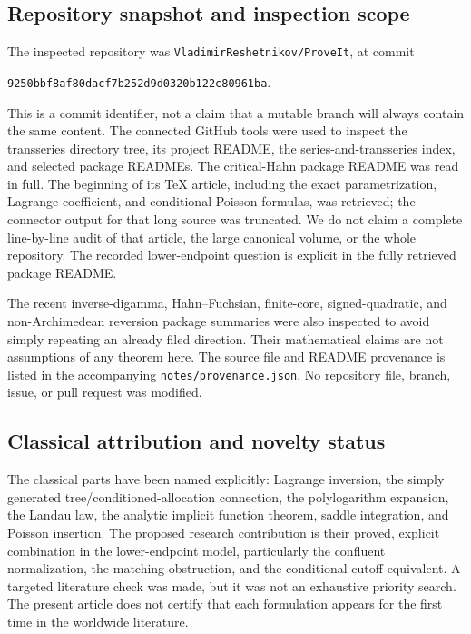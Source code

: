\documentclass[11pt,a4paper]{article}
\numberwithin{equation}{section}
\theoremstyle{definition}
\theoremstyle{remark}
\begin{document}
\subsection{Repository snapshot and inspection scope}
The inspected repository was \texttt{VladimirReshetnikov/ProveIt}, at
commit
\begin{center}\small\texttt{9250bbf8af80dacf7b252d9d0320b122c80961ba}.\end{center}
This is a commit identifier, not a claim that a mutable branch will
always contain the same content. The connected GitHub tools were used
to inspect the transseries directory tree, its project README, the
series-and-transseries index, and selected package READMEs. The
critical-Hahn package README was read in full. The beginning of its
TeX article, including the exact parametrization, Lagrange coefficient,
and conditional-Poisson formulas, was retrieved; the connector output
for that long source was truncated. We do not claim a complete
line-by-line audit of that article, the large canonical volume, or the
whole repository. The recorded lower-endpoint question is explicit in
the fully retrieved package README.

The recent inverse-digamma, Hahn--Fuchsian, finite-core, signed-quadratic,
and non-Archimedean reversion package summaries were also inspected to
avoid simply repeating an already filed direction. Their mathematical
claims are not assumptions of any theorem here. The source file and
README provenance is listed in the accompanying
\texttt{notes/provenance.json}. No repository file, branch, issue,
or pull request was modified.

\subsection{Classical attribution and novelty status}
The classical parts have been named explicitly: Lagrange inversion,
the simply generated tree/conditioned-allocation connection, the
polylogarithm expansion, the Landau law, the analytic implicit function
theorem, saddle integration, and Poisson insertion. The proposed
research contribution is their proved, explicit combination in the
lower-endpoint model, particularly the confluent normalization,
the matching obstruction, and the conditional cutoff equivalent.
A targeted literature check was made, but it was not an exhaustive
priority search. The present article does not certify that each
formulation appears for the first time in the worldwide literature.
\end{document}
